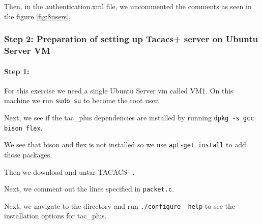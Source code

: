 \documentclass[main.tex]{subfiles}
\begin{document}
Then, in the authentication.xml file, we uncommented the comments as seen in the figure \ref{fig:8users}, 







\break
\subsubsection{Step 2: Preparation of setting up Tacacs+ server on Ubuntu Server VM}
\paragraph{Step 1: }
\hfill \break

For this exercise we need a single Ubuntu Server vm called VM1. On this machine we run \texttt{sudo su} to become the root user.


Next, we see if the tac\_plus dependencies are installed by running \texttt{dpkg -s gcc bison flex}.



We see that bison and flex is not installed so we use \texttt{apt-get install} to add those packages.


Then we download and untar TACACS+.



Next, we comment out the lines specified in \texttt{packet.c}.


Next, we navigate to the directory and run \texttt{./configure -help} to see the installation options for tac\_plus.
\end{document}
